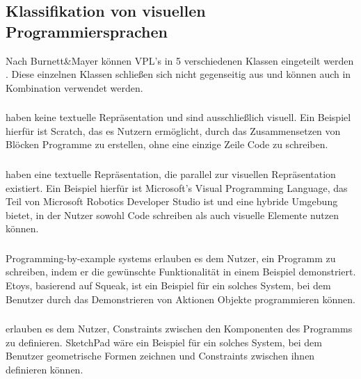 \documentclass[ngerman]{article}
\begin{document}
\subsection{Klassifikation von visuellen Programmiersprachen}

Nach Burnett\&Mayer können VPL's in 5 verschiedenen Klassen eingeteilt werden \cite{BURNETT1994287}. Diese einzelnen Klassen schließen sich nicht gegenseitig aus und können auch in Kombination verwendet werden.

\subsubsection{}
 haben keine textuelle Repräsentation und sind ausschließlich visuell. Ein Beispiel hierfür ist Scratch, das es Nutzern ermöglicht, durch das Zusammensetzen von Blöcken Programme zu erstellen, ohne eine einzige Zeile Code zu schreiben. \cite{mitScratchAbout}

\subsubsection{}
 haben eine textuelle Repräsentation, die parallel zur visuellen Repräsentation existiert. 
Ein Beispiel hierfür ist Microsoft's Visual Programming Language, das Teil von Microsoft Robotics Developer Studio ist und eine hybride Umgebung bietet, in der Nutzer sowohl Code schreiben als auch visuelle Elemente nutzen können. \cite{microsoftIntroduction}

\subsubsection{}
Programming-by-example systems erlauben es dem Nutzer, ein Programm zu schreiben, indem er die gewünschte Funktionalität in einem Beispiel demonstriert. Etoys, basierend auf Squeak, ist ein Beispiel für ein solches System, bei dem Benutzer durch das Demonstrieren von Aktionen Objekte programmieren können. \cite{squeakSqueakSmalltalk}

\subsubsection{}
 erlauben es dem Nutzer, Constraints zwischen den Komponenten des Programms zu definieren. SketchPad wäre ein Beispiel für ein solches System, bei dem Benutzer geometrische Formen zeichnen und Constraints zwischen ihnen definieren können. \cite{sutherlandSketchpad}
\end{document}
